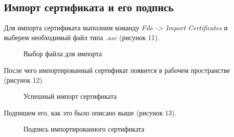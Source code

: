 \documentclass[10pt,a4paper]{report}
\begin{document}
\subsection{Импорт сертификата и его подпись}
Для импорта сертификата выполним команду \textit{File -> Import Certificates} и выберем необходимый файл типа \textit{.asc} (рисунок 11).
\begin{figure}[h]
	\caption{Выбор файла для импорта}
\end{figure}

После чего импортированный сертификат появится в рабочем пространстве (рисунок 12).
\begin{figure}[h]
	\caption{Успешный импорт сертификата}
\end{figure}

Подпишем его, как это было описано выше (рисунок 13).
\begin{figure}[h]
	\caption{Подпись импортированного сертификата }
\end{figure}
\end{document}
